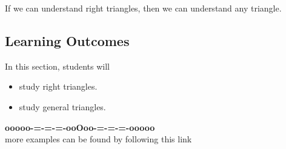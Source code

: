 \documentclass{ximera}
\begin{document}
If we can understand right triangles, then we can understand any triangle.










\subsection*{Learning Outcomes}


\begin{sectionOutcomes}
In this section, students will 

\begin{itemize}
\item study right triangles.
\item study general triangles.
\end{itemize}
\end{sectionOutcomes}









\begin{center}
\textbf{\textcolor{green!50!black}{ooooo-=-=-=-ooOoo-=-=-=-ooooo}} \\

more examples can be found by following this link\\ 

\end{center}
\end{document}
